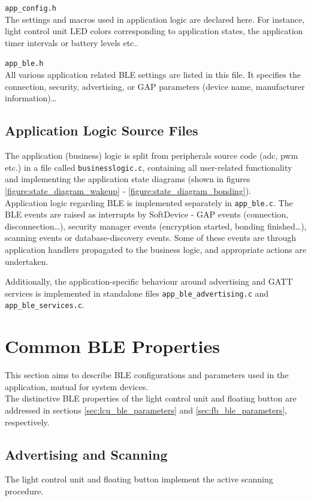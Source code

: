         \verb|app_config.h|\\
            The settings and macros used in application logic are declared here. For instance, light control unit LED colors corresponding to application states, the application timer intervals or battery levels etc..
            
        \verb|app_ble.h|\\
            All various application related BLE settings are listed in this file. It specifies the connection, security, advertising, or GAP parameters (device name, manufacturer information)\ldots
    
    \subsection{Application Logic Source Files}
        The application (business) logic is split from peripherals source code (adc, pwm etc.) in a file called \verb|businesslogic.c|, containing all user-related functionality and implementing the application state diagrams (shown in figures \ref{figure:state_diagram_wakeup} - \ref{figure:state_diagram_bonding}).\\
        Application logic regarding BLE is implemented separately in \verb|app_ble.c|. The BLE events are raised as interrupts by SoftDevice - GAP events (connection, disconnection\ldots), security manager events (encryption started, bonding finished\ldots), scanning events or database-discovery events. Some of these events are through application handlers propagated to the business logic, and appropriate actions are undertaken.
        
        Additionally, the application-specific behaviour around advertising and GATT services is implemented in standalone files \verb|app_ble_advertising.c| and \verb|app_ble_services.c|.
    
    
\section{Common BLE Properties}
    \label{sec:app_ble}
    This section aims to describe BLE configurations and parameters used in the application, mutual for system devices.\\
    The distinctive BLE properties of the light control unit and floating button are addressed in sections \ref{sec:lcu_ble_parameters} and \ref{sec:fb_ble_parameters}, respectively.
    
    \subsection{Advertising and Scanning}
        \label{sec:app_ble_advertising_and_scanning}
        The light control unit and floating button implement the active scanning procedure.  
        
